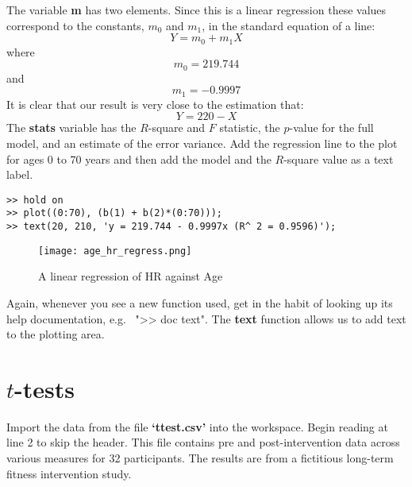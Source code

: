 \documentclass[12pt,a4paper]{article}
\begin{document}
The variable \textbf{m} has two elements.  Since this is a linear regression these values correspond to the constants, $m_{0}$ and $m_{1}$, in the standard equation of a line:
\begin{equation*}
Y = m_{0} + m_{1}X
\end{equation*}
where\\
\begin{equation*}
m_{0} = 219.744
\end{equation*}
and\\
\begin{equation*}
m_{1} = -0.9997
\end{equation*}
It is clear that our result is very close to the estimation that:
\begin{equation*}
Y = 220 - X
\end{equation*}
The \textbf{stats} variable has the $R$-square and $F$ statistic, the $p$-value for the full model, and an estimate of the error variance.  
Add the regression line to the plot for ages 0 to 70 years and then add the model and the $R$-square value as a text label.
\begin{lstlisting}[style=Matlab-editor]
% 'hold' axes to add plots without creating new figure
>> hold on 
>> plot((0:70), (b(1) + b(2)*(0:70)));
>> text(20, 210, 'y = 219.744 - 0.9997x (R^ 2 = 0.9596)');
\end{lstlisting}
\begin{figure}[H]
	\begin{center}
		\texttt{[image: age\_hr\_regress.png]}
		\caption{A linear regression of HR against Age}
		\label{fig:agehr_regress}
	\end{center}
\end{figure}
Again, whenever you see a new function used, get in the habit of looking up its help documentation, e.g.~ ">> doc text".
The \textbf{text} function allows us to add text to the plotting area. 

\section{$t$-tests}
Import the data from the file \textbf{`ttest.csv'} into the workspace.  
Begin reading at line 2 to skip the header.  
This file contains pre and post-intervention data across various measures for 32 participants.  
The results are from a fictitious long-term fitness intervention study.
\end{document}

